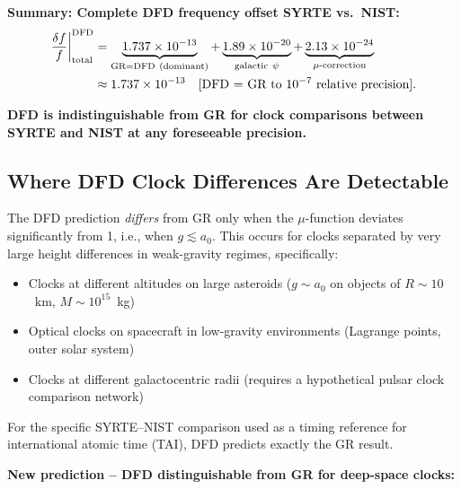 \documentclass[aps,prd,twocolumn,superscriptaddress,nofootinbib]{revtex4-2}
\begin{document}
\textbf{Summary: Complete DFD frequency offset SYRTE vs.\ NIST:}
\begin{align}
\frac{\delta f}{f}\bigg|_{\rm total}^{\rm DFD}
&= \underbrace{1.737\times10^{-13}}_{\rm GR = DFD\ (dominant)}
+ \underbrace{1.89\times10^{-20}}_{\rm galactic\ \psi}
+ \underbrace{2.13\times10^{-24}}_{\mu\text{-correction}} \nonumber\\
&\approx 1.737\times10^{-13}
\quad[\text{DFD = GR to }10^{-7}\text{ relative precision}].
\end{align}

\textbf{DFD is indistinguishable from GR for clock comparisons between
SYRTE and NIST at any foreseeable precision.}

\subsection{Where DFD Clock Differences Are Detectable}

The DFD prediction \emph{differs} from GR only when the $\mu$-function
deviates significantly from 1, i.e., when $g \lesssim a_0$.
This occurs for clocks separated by very large height differences
in weak-gravity regimes, specifically:

\begin{itemize}
\item Clocks at different altitudes on large asteroids
      ($g \sim a_0$ on objects of $R \sim 10$~km, $M \sim 10^{15}$~kg)
\item Optical clocks on spacecraft in low-gravity environments
      (Lagrange points, outer solar system)
\item Clocks at different galactocentric radii (requires a hypothetical
      pulsar clock comparison network)
\end{itemize}

For the specific SYRTE--NIST comparison used as a timing reference for
international atomic time (TAI), DFD predicts exactly the GR result.

\textbf{New prediction -- DFD distinguishable from GR for deep-space clocks:}
\end{document}
